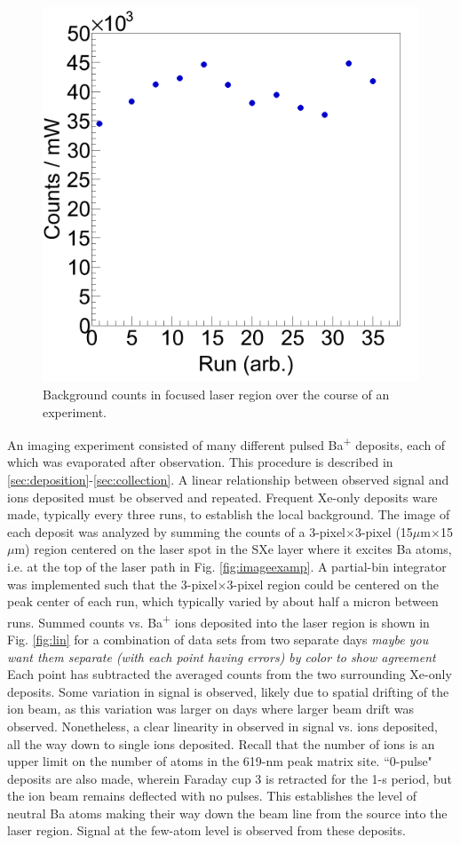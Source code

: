 \begin{figure} %
        \centering
                \includegraphics[width=.4\textwidth]{figures/xe_variation.png}
                \caption{Background counts in focused laser region over the course of an experiment.}
\label{fig:xevar}
\end{figure}

An imaging experiment consisted of many different pulsed Ba\textsuperscript{+} deposits, each of which was evaporated after observation.  This procedure is described in \ref{sec:deposition}-\ref{sec:collection}.  A linear relationship between observed signal and ions deposited must be observed and repeated.  Frequent Xe-only deposits ware made, typically every three runs, to establish the local background.  The image of each deposit was analyzed by summing the counts of a 3-pixel$\times$3-pixel (15$\mu$m$\times$15$\mu$m) region centered on the laser spot in the SXe layer where it excites Ba atoms, i.e. at the top of the laser path in Fig. \ref{fig:imageexamp}.  A partial-bin integrator was implemented such that the 3-pixel$\times$3-pixel region could be centered on the peak center of each run, which typically varied by about half a micron between runs.  Summed counts vs. Ba\textsuperscript{+} ions deposited into the laser region is shown in Fig. \ref{fig:lin} for a combination of data sets from two separate days \emph{\color{blue}maybe you want them separate (with each point having errors) by color to show agreement }  Each point has subtracted the averaged counts from the two surrounding Xe-only deposits.  Some variation in signal is observed, likely due to spatial drifting of the ion beam, as this variation was larger on days where larger beam drift was observed.  Nonetheless, a clear linearity in observed in signal vs. ions deposited, all the way down to single ions deposited.  Recall that the number of ions is an upper limit on the number of atoms in the 619-nm peak matrix site.  ``0-pulse" deposits are also made, wherein Faraday cup 3 is retracted for the 1-s period, but the ion beam remains deflected with no pulses.  This establishes the level of neutral Ba atoms making their way down the beam line from the source into the laser region.  Signal at the few-atom level is observed from these deposits.

